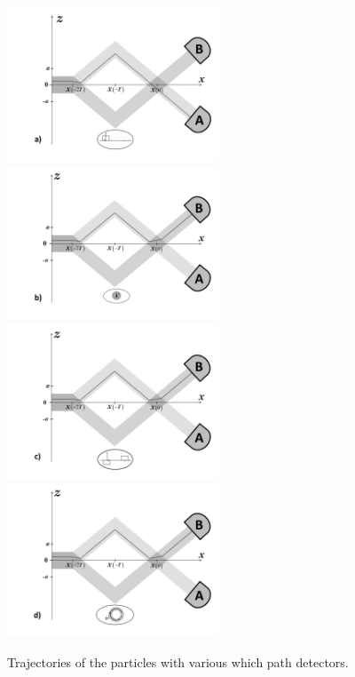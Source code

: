 \documentclass[12pt,preprint,tightenlines]{elsarticle}
\begin{document}
\begin{figure}[H]
   \vspace{-20pt}
   \includegraphics[width=6.3cm]{7a.pdf}\\
  \vspace{-10pt}
   \includegraphics[width=6.3cm]{7b.pdf}\\ \vspace{-8pt}
     \includegraphics[width=6.3cm]{7c.pdf}\\ \vspace{-8pt}
     \includegraphics[width=6.3cm]{7d.pdf}\\ \vspace{-15pt}
    \caption{Trajectories of the particles with various which path detectors.
}
\end{figure}
\end{document}
